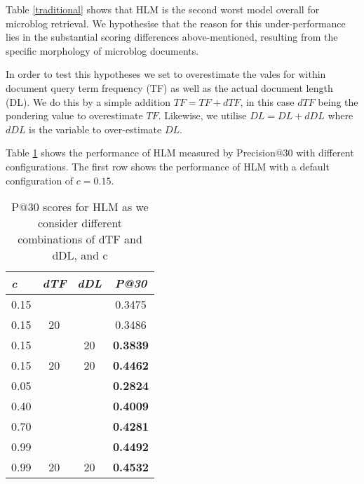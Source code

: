 %
%   
%

Table \ref{traditional} shows that HLM is the second worst model overall for microblog retrieval. We hypothesise that the reason for this under-performance lies in the substantial scoring differences above-mentioned, resulting from the specific morphology of microblog documents.

In order to test this hypotheses we set to overestimate the vales for within document query term frequency (TF) as well as the actual document length (DL). We do this by a simple addition \(TF = TF+dTF\), in this case \(dTF\) being the pondering value to overestimate \(TF\). Likewise, we utilise \(DL = DL+dDL\) where \(dDL\) is the variable to over-estimate \(DL\).

Table \ref{hlmOverestimates} shows the performance of HLM measured by Precision@30 with different configurations. The first row shows the performance of HLM with a default configuration of $c = 0.15$. 

\begin{table}[]

	\caption{P@30 scores for HLM as we consider different combinations of dTF and dDL, and c}
	\centering
	\begin{tabular}{l|c|c|c} 	
	\textit{\textbf{c}} & 
	\textit{\textbf{dTF}} & 
	\textit{\textbf{dDL}} & 
	\textit{\textbf{P@30}} 	
	\tabularnewline
	\hline
	0.15 &    &    & 0.3475\\
	0.15 & 20 &    & 0.3486\\
	0.15 &    & 20 & \textbf{0.3839} \\
	0.15 & 20 & 20 & \textbf{0.4462} \\
	\hline
	\hline
	0.05 &  &  & \textbf{0.2824} \\
	0.40 &  &  & \textbf{0.4009} \\
	0.70 &  &  & \textbf{0.4281} \\
	0.99 &  &  & \textbf{0.4492} \\
	\hline
    \hline
	0.99 & 20 & 20 & \textbf{0.4532} \\	
	\hline
	\end{tabular}
	\label{hlmOverestimates}
\end{table}

